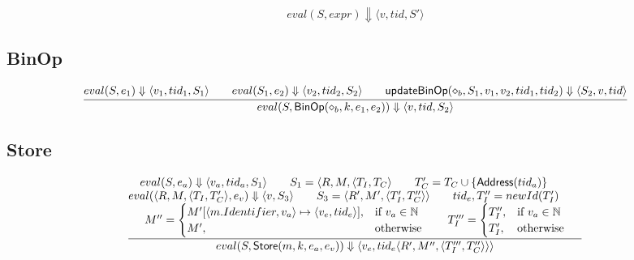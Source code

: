 \documentclass{article}
\newcommand{\eval}[3]{eval(#1,#2) \Downarrow #3}
\begin{document}
\[ \eval{S}{expr}{\langle v,tid,S'\rangle} \]

\subsection{BinOp}
\[
\frac{
    \begin{array}{@{}c@{}}
        \eval{S}{e_1}{\langle v_1,tid_1,S_1\rangle} \qquad
        \eval{S_1}{e_2}{\langle v_2,tid_2,S_2\rangle}\qquad
        \mathsf{updateBinOp}(\diamond_b, S_1, v_1, v_2, tid_1, tid_2) \Downarrow \langle S_2,v,tid \rangle
    \end{array}
} {
    \eval{S}{\mathsf{BinOp}(\diamond_b,k,e_1,e_2)}
    {\langle v,tid,S_2\rangle}
}
\]

\subsection{Store}
\[
\frac{
    \begin{array}{@{}c@{}}
        \eval{S}{e_a}{\langle v_a,tid_a,S_1\rangle} \qquad
        S_1=\langle R,M,\langle T_I, T_C \rangle\qquad
        T_C'=T_C \cup \{\mathsf{Address}(tid_a)\}\qquad\\
        \eval{\langle R,M,\langle T_I, T_C' \rangle}{e_v}{\langle v,S_3\rangle}\qquad
        S_3=\langle R',M',\langle T_I',T_C''\rangle\rangle\qquad
        tid_e, T_I'' = newId(T_I')\qquad\\
        M'' =
        \begin{cases}
            M'[\langle m.Identifier, v_a \rangle \mapsto \langle v_e, tid_e \rangle], & \text{if } v_a \in \mathbb{N} \\
            M', & \text{otherwise}
        \end{cases}\qquad
        T_I''' =
        \begin{cases}
            T_I'', & \text{if } v_a \in \mathbb{N} \\
            T_I', & \text{otherwise}
        \end{cases}
    \end{array}
} {
    \eval{S}{\mathsf{Store}(m,k,e_a,e_v)}
    {\langle v_e,tid_e\langle R',M'',\langle T_I''',T_C''\rangle\rangle\rangle}
}
\]
\end{document}
